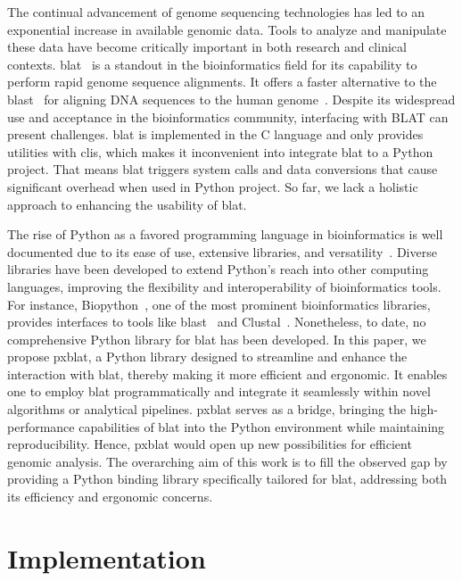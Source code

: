 The continual advancement of genome sequencing technologies has led to an exponential increase in available genomic data.
Tools to analyze and manipulate these data have become critically important in both research and clinical contexts.
\gls{blat}~\citep{kent2002blat} is a standout in the bioinformatics field for its capability to perform rapid genome sequence alignments.
It offers a faster alternative to the \gls{blast}~\citep{altschul1990basic} for aligning DNA sequences to the human genome~\citep{kent2002blat}.
Despite its widespread use and acceptance in the bioinformatics community, interfacing with BLAT can present challenges.
\gls{blat} is implemented in the C language and only provides utilities with \glspl{cli}, which makes it inconvenient into integrate \gls{blat} to a Python project.
That means \gls{blat} triggers system calls and data conversions that cause significant overhead when used in Python project.
So far, we lack a holistic approach to enhancing the usability of \gls{blat}.

The rise of Python as a favored programming language in bioinformatics is well documented due to its ease of use, extensive libraries, and versatility~\citep{perkel2015programming}.
Diverse libraries have been developed to extend Python's reach into other computing languages, improving the flexibility and interoperability of bioinformatics tools.
For instance, Biopython~\citep{cock2009biopython}, one of the most prominent bioinformatics libraries, provides interfaces to tools like \gls{blast}~\citep{altschul1990basic} and Clustal~\citep{higgins1988clustal}.
Nonetheless, to date, no comprehensive Python library for \gls{blat} has been developed.
In this paper, we propose \gls{pxblat}, a Python library designed to streamline and enhance the interaction with \gls{blat}, thereby making it more efficient and ergonomic.
It enables one to employ \gls{blat} programmatically and integrate it  seamlessly within novel algorithms or analytical pipelines.
\gls{pxblat} serves as a bridge, bringing the high-performance capabilities of \gls{blat} into the Python environment while maintaining reproducibility.
Hence, \gls{pxblat} would open up new possibilities for efficient genomic analysis.
The overarching aim of this work is to fill the observed gap by providing a Python binding library specifically tailored for \gls{blat}, addressing both its efficiency and ergonomic concerns.

\section*{Implementation}\label{sec:implementation}

